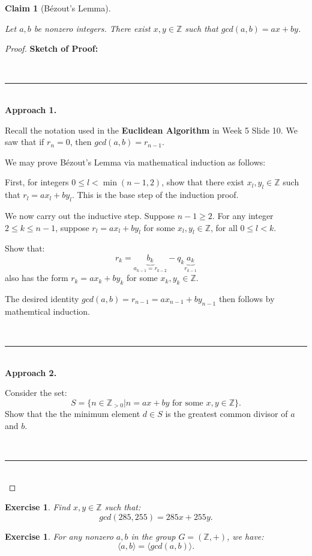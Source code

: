 \documentclass[a4paper,12pt]{report}
\newcounter{statement}
\numberwithin{statement}{chapter}
\newtheorem{claim}[statement]{Claim}
\newtheorem{ex}[statement]{\bf Exercise}
\numberwithin{equation}{chapter}
\numberwithin{section}{chapter}
\numberwithin{subsection}{section}
\begin{document}
\begin{claim}[Bézout's Lemma]

\label{bezoutslemma}



Let $a, b$ be nonzero integers.
There exist $x, y \in \mathbb{Z}$ such that $gcd(a, b) = ax + by$.
\end{claim}
\begin{proof}

 {\bf Sketch of Proof:} 

\quad\\\hrule
\quad\\

 {\bf Approach 1.} 

Recall the notation used in the  {\bf Euclidean Algorithm} 
in Week 5 Slide 10.
We saw that if $r_n = 0$, then $gcd(a, b) = r_{n - 1}$.



We may prove Bézout's Lemma via mathematical induction as follows:




First, for integers $0 \leq l < \min(n - 1, 2)$, show that there exist
$x_l, y_l \in \mathbb{Z}$ such that $r_l = a x_l + b y_l$.
This is the base step of the induction proof.




We now carry out the inductive step.
Suppose $n - 1 \geq 2$. For any integer $2 \leq k \leq n - 1$,
suppose $r_l = a x_l + b y_l$ for some $x_l, y_l \in \mathbb{Z}$, for all
$0\leq l < k$.



Show that:
\[r_k = \underbrace{b_k}_{a_{k - 1} = r_{k - 2}} - q_{k} \underbrace{a_{k}}_{r_{k - 1}}\]
also has the form $r_k = a x_k + b y_k$
for some $x_k, y_k \in \mathbb{Z}$.




The desired identity $gcd(a, b) = r_{n - 1} = ax_{n - 1} + by_{n - 1}$
then follows by mathemtical induction.


\quad\\\hrule
\quad\\

 {\bf Approach 2.} 

Consider the set:
\[S = \{n \in \mathbb{Z}_{> 0} | n = ax + by \text{ for some } x, y \in \mathbb{Z}\}.\]
Show that the the minimum element $d \in S$ is the greatest common divisor of
$a$ and $b$.


\quad\\\hrule
\quad\\


\end{proof}
\begin{ex}

Find $x, y \in \mathbb{Z}$ such that:
\[gcd(285, 255) = 285 x + 255 y.\]
\end{ex}
\begin{ex}

For any nonzero $a, b$ in  the group $G = (\mathbb{Z}, +)$,
we have:
\[
\langle a, b \rangle = \langle gcd(a, b) \rangle.
\]
\end{ex}
\end{document}
